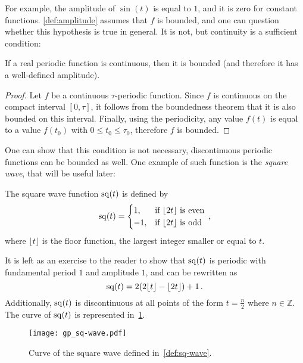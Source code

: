 \noindent For example, the amplitude of $\sin(t)$ is equal to $1$, and it is zero for
constant functions. \cref{def:amplitude} assumes that $f$ is bounded, and one can question
whether this hypothesis is true in general. It is not, but continuity is a sufficient
condition:
\begin{proposition}
  If a real periodic function is continuous, then it is bounded (and therefore it has a
  well-defined amplitude).
\end{proposition}
\begin{proof}
  Let $f$ be a continuous $\tau$-periodic function. Since $f$ is continuous on the compact
  interval $[0,\tau]$, it follows from the boundedness theorem that it is also bounded on
  this interval. Finally, using the periodicity, any value $f(t)$ is equal to a value
  $f(t_0)$ with $0\leq t_0\leq \tau_0$, therefore $f$ is bounded.
\end{proof}
\noindent One can show that this condition is not necessary, \ie discontinuous periodic
functions can be bounded as well. One example of such function is the \emph{square wave},
that will be useful later:
\begin{definition}
  \label{def:sq-wave}
  The square wave function $\operatorname{sq}(t)$ is defined by
  \begin{equation}
    \operatorname{sq}(t)=
    \begin{cases}
      1, &\text{if~}\lfloor 2t\rfloor~\text{is even}\\
      -1, &\text{if~}\lfloor 2t\rfloor~\text{is odd}\\
    \end{cases}\,,
    \label{eq:wave-square}
  \end{equation}
  where $\lfloor t\rfloor$ is the floor function, \ie the largest integer smaller or equal
  to $t$.
\end{definition}
\noindent It is left as an exercise to the reader to show that $\operatorname{sq}(t)$ is periodic with
fundamental period $1$ and amplitude $1$, and can be rewritten as
\begin{equation}
  \operatorname{sq}(t)=2(2\lfloor t\rfloor-\lfloor 2t\rfloor)+1\,.
\end{equation}
Additionally, $\operatorname{sq}(t)$ is discontinuous at all points of the form $t=\frac{n}{2}$ where
$n\in\mathbb{Z}$. The curve of $\operatorname{sq}(t)$ is represented in~\cref{fig:sq-wave}.
\begin{figure}[t]
  \centering
  \texttt{[image: gp\_sq-wave.pdf]}
  \caption{Curve of the square wave defined in~\cref{def:sq-wave}.}
  \label{fig:sq-wave}
\end{figure}

